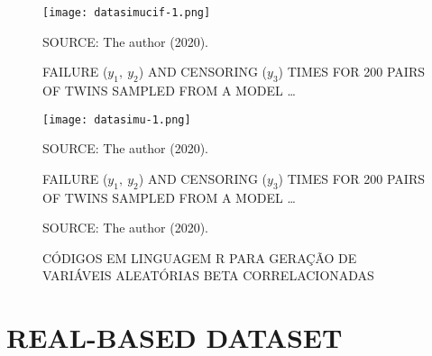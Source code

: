 \begin{figure}[H]
  \setlength{\abovecaptionskip}{.0001pt}
  \caption{FAILURE (\(y_{1},~y_{2}\)) AND CENSORING (\(y_{3}\)) TIMES
    FOR 200 PAIRS OF TWINS SAMPLED FROM A MODEL \dots}
  \vspace{0.425cm} \centering
  \texttt{[image: datasimucif-1.png]}
  \\
  \vspace{0.45cm}
  \begin{footnotesize}
    SOURCE: The author (2020).
  \end{footnotesize}
  \label{fig:datasimucif}
\end{figure}

\begin{figure}[H]
  \setlength{\abovecaptionskip}{.0001pt}
  \caption{FAILURE (\(y_{1},~y_{2}\)) AND CENSORING (\(y_{3}\)) TIMES
    FOR 200 PAIRS OF TWINS SAMPLED FROM A MODEL \dots}
  \vspace{0.425cm} \centering
  \texttt{[image: datasimu-1.png]}
  \\
  \vspace{0.45cm}
  \begin{footnotesize}
    SOURCE: The author (2020).
  \end{footnotesize}
  \label{fig:datasimu}
\end{figure}

\begin{figure}[H]
  \vspace{0.35cm}
  \setlength{\abovecaptionskip}{.00001pt}
  \caption{CÓDIGOS EM LINGUAGEM R PARA GERAÇÃO DE VARIÁVEIS ALEATÓRIAS
    BETA CORRELACIONADAS}
  \vspace{-0.25cm}
  \begin{program}[H]
  \end{program}
  \begin{footnotesize}
    \begin{center}
      SOURCE: The author (2020).
    \end{center}
  \end{footnotesize}
  \label{fig:steps1e2}
\end{figure}

\section{REAL-BASED DATASET}
\label{cap:data}

